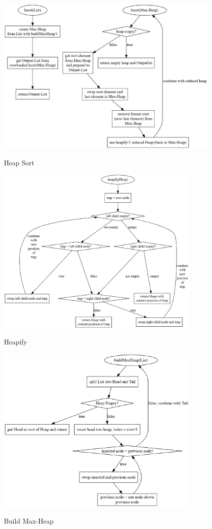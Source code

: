 \documentclass[11pt]{article}
\begin{document}
    \begin{figure}[hbt]
        \caption{Heap Sort}
        \centering
        \includegraphics[width = 11cm]{hsort.pdf}\label{fig:hsort}
    \end{figure}

    \begin{figure}[hb]
        \caption{Heapify}
        \centering
        \includegraphics[width = 10cm]{heapify.pdf}\label{fig:heapify}
    \end{figure}

    \begin{figure}[hbt]
        \caption{Build Max-Heap}
        \centering
        \includegraphics[width = 10cm]{buildMaxHeap.pdf}\label{fig:buildMaxHeap}
    \end{figure}
\end{document}
